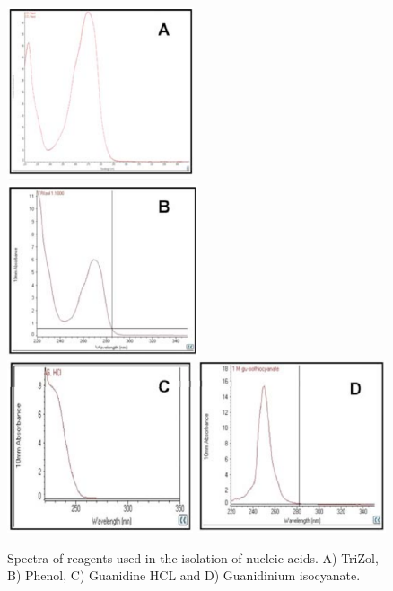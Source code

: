 \documentclass[11pt, oneside]{article}
\begin{document}
		\vspace{5mm}

		\begin{figure}[h]
			\begin{center}
				\includegraphics[height=2in]{./images/Nanodrop_A.pdf}
				\includegraphics[height=2in]{./images/Nanodrop_B.pdf} \\
				\includegraphics[height=2in]{./images/Nanodrop_C.pdf}
				\includegraphics[height=2in]{./images/Nanodrop_D.pdf}
			\end{center}
			\caption {Spectra of reagents used in the isolation of nucleic acids. A) TriZol, B) Phenol, C) Guanidine HCL and D) Guanidinium isocyanate.}
		\end{figure}	
\end{document}
